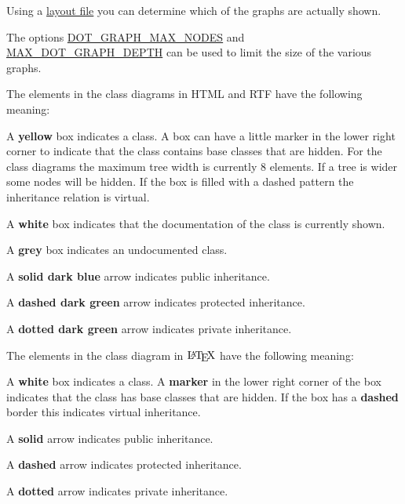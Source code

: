 Using a \hyperlink{customize}{layout file} you can determine which of the graphs are actually shown.

The options \hyperlink{config_cfg_dot_graph_max_nodes}{DOT\_\-GRAPH\_\-MAX\_\-NODES} and \hyperlink{config_cfg_max_dot_graph_depth}{MAX\_\-DOT\_\-GRAPH\_\-DEPTH} can be used to limit the size of the various graphs.

The elements in the class diagrams in HTML and RTF have the following meaning: 
\begin{DoxyItemize}
\item A {\bfseries yellow} box indicates a class. A box can have a little marker in the lower right corner to indicate that the class contains base classes that are hidden. For the class diagrams the maximum tree width is currently 8 elements. If a tree is wider some nodes will be hidden. If the box is filled with a dashed pattern the inheritance relation is virtual. 
\item A {\bfseries white} box indicates that the documentation of the class is currently shown. 
\item A {\bfseries grey} box indicates an undocumented class. 
\item A {\bfseries solid dark blue} arrow indicates public inheritance. 
\item A {\bfseries dashed dark green} arrow indicates protected inheritance. 
\item A {\bfseries dotted dark green} arrow indicates private inheritance. 
\end{DoxyItemize}

The elements in the class diagram in $\mbox{\LaTeX}$ have the following meaning: 
\begin{DoxyItemize}
\item A {\bfseries white} box indicates a class. A {\bfseries marker} in the lower right corner of the box indicates that the class has base classes that are hidden. If the box has a {\bfseries dashed} border this indicates virtual inheritance. 
\item A {\bfseries solid} arrow indicates public inheritance. 
\item A {\bfseries dashed} arrow indicates protected inheritance. 
\item A {\bfseries dotted} arrow indicates private inheritance. 
\end{DoxyItemize}

